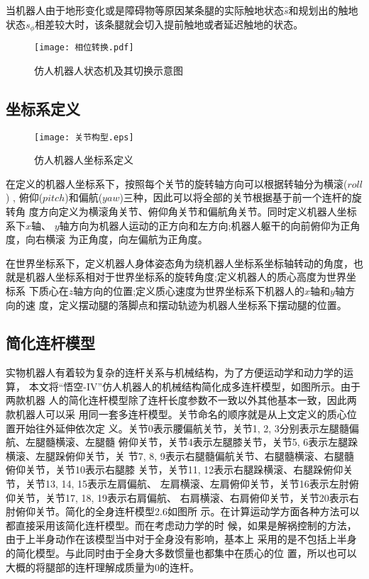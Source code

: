 当机器人由于地形变化或是障碍物等原因某条腿的实际触地状态$\hat s$和规划出的触地状态$s_{\phi}$相差较大时，该条腿就会切入提前触地或者延迟触地的状态。

\begin{figure}[htbp]
    \centering
    \texttt{[image: 相位转换.pdf]}
    \caption{\label{fig:state_machine}仿人机器人状态机及其切换示意图}
\end{figure}

\subsection{坐标系定义}
\begin{figure}[htbp]
    \centering
    \texttt{[image: 关节构型.eps]}
    \caption{\label{fig:coordination}仿人机器人坐标系定义}
\end{figure}
在定义的机器人坐标系下，按照每个关节的旋转轴方向可以根据转轴分为横滚($roll$) ,
俯仰($pitch$)和偏航($yaw$)三种，因此可以将全部的关节根据基于前一个连杆的旋转角
度方向定义为横滚角关节、俯仰角关节和偏航角关节。同时定义机器人坐标系下$x$轴、
$y$轴方向为机器人运动的正方向和左方向;机器人躯干的向前俯仰为正角度，向右横滚
为正角度，向左偏航为正角度。

在世界坐标系下，定义机器人身体姿态角为绕机器人坐标系坐标轴转动的角度，也
就是机器人坐标系相对于世界坐标系的旋转角度;定义机器人的质心高度为世界坐标系
下质心在$z$轴方向的位置;定义质心速度为世界坐标系下机器人的$x$轴和$y$轴方向的速
度，定义摆动腿的落脚点和摆动轨迹为机器人坐标系下摆动腿的位置。
\subsection{简化连杆模型}

实物机器人有着较为复杂的连杆关系与机械结构，为了方便运动学和动力学的运算，
本文将“悟空-IV”仿人机器人的机械结构简化成多连杆模型，如图所示。由于两款机器
人的简化连杆模型除了连杆长度参数不一致以外其他基本一致，因此两款机器人可以采
用同一套多连杆模型。关节命名的顺序就是从上文定义的质心位置开始往外延伸依次定
义。关节0表示腰偏航关节，关节1, 2, 3分别表示左腿髓偏航、左腿髓横滚、左腿髓
俯仰关节，关节4表示左腿膝关节，关节5, 6表示左腿跺横滚、左腿跺俯仰关节，关
节7,  8,   9表示右腿髓偏航关节、右腿髓横滚、右腿髓俯仰关节，关节10表示右腿膝
关节，关节11, 12表示右腿跺横滚、右腿跺俯仰关节，关节13, 14, 15表示左肩偏航、
左肩横滚、左肩俯仰关节，关节16表示左肘俯仰关节，关节17, 18, 19表示右肩偏航、
右肩横滚、右肩俯仰关节，关节20表示右肘俯仰关节。简化的全身连杆模型2.6如图所
示。在计算运动学方面各种方法可以都直接采用该简化连杆模型。而在考虑动力学的时
候，如果是解祸控制的方法，由于上半身动作在该模型当中对于全身没有影响，基本上
采用的是不包括上半身的简化模型。与此同时由于全身大多数惯量也都集中在质心的位
置，所以也可以大概的将腿部的连杆理解成质量为0的连杆。

